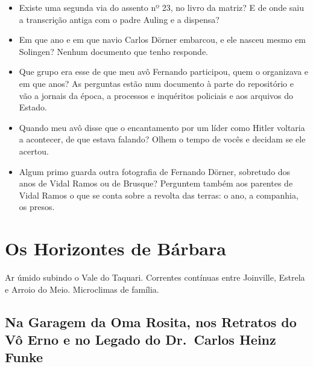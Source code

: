 \documentclass[
  brazilian,
  11pt,
  openany]{book}
\providecommand{\tightlist}{%
  \setlength{\itemsep}{0pt}\setlength{\parskip}{0pt}}
\newenvironment{boletim}{\begin{center}\begin{minipage}{0.85\linewidth}\small\itshape}{\end{minipage}\end{center}}
\begin{document}
\begin{itemize}
\tightlist
\item
  Existe uma segunda via do assento nº 23, no livro da matriz? E de onde
  saiu a transcrição antiga com o padre Auling e a dispensa?
\item
  Em que ano e em que navio Carlos Dörner embarcou, e ele nasceu mesmo
  em Solingen? Nenhum documento que tenho responde.
\item
  Que grupo era esse de que meu avô Fernando participou, quem o
  organizava e em que anos? As perguntas estão num documento à parte do
  repositório e vão a jornais da época, a processos e inquéritos
  policiais e aos arquivos do Estado.
\item
  Quando meu avô disse que o encantamento por um líder como Hitler
  voltaria a acontecer, de que estava falando? Olhem o tempo de vocês e
  decidam se ele acertou.
\item
  Algum primo guarda outra fotografia de Fernando Dörner, sobretudo dos
  anos de Vidal Ramos ou de Brusque? Perguntem também aos parentes de
  Vidal Ramos o que se conta sobre a revolta das terras: o ano, a
  companhia, os presos.
\end{itemize}

\part{Os Horizontes de Bárbara}\label{os-horizontes-de-buxe1rbara}

\begin{boletim}

Ar úmido subindo o Vale do Taquari. Correntes contínuas entre Joinville,
Estrela e Arroio do Meio. Microclimas de família.

\end{boletim}

\chapter{Na Garagem da Oma Rosita, nos Retratos do Vô Erno e no Legado
do Dr.~Carlos Heinz Funke}\label{cap-11}
\end{document}
